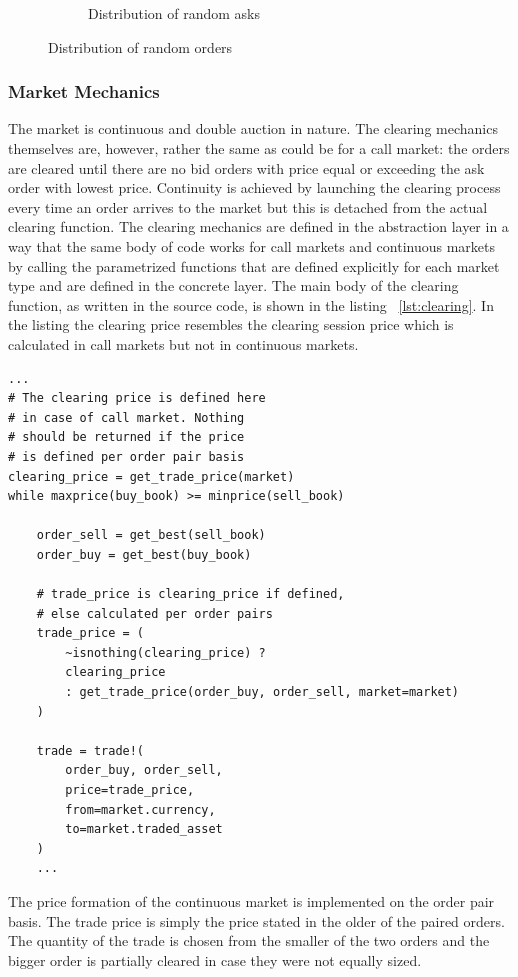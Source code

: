 \begin{figure}
\begin{subfigure}{.5\textwidth}
      \caption{Distribution of random asks}
      \label{fig:gener_asks}
    \end{subfigure}
    \caption{Distribution of random orders}
    \label{fig:generated_orders}
\end{figure}


\subsubsection{Market Mechanics}
The market is continuous and double auction in nature.
The clearing mechanics themselves are, however, 
rather the same as could be for a call market: 
the orders are cleared until there
are no bid orders with price equal or exceeding the
ask order with lowest price. 
Continuity is achieved by launching the clearing process
every time an order arrives to the market but this is
detached from the actual clearing function. 
The clearing mechanics are defined in 
the abstraction layer in a way that the same body
of code works for call markets and continuous markets
by calling the parametrized functions that are 
defined explicitly for each market type and are defined
in the concrete layer. The main body of the clearing function, 
as written in the source code, is shown in the listing ~\ref{lst:clearing}.
In the listing the clearing price resembles the clearing
session price which is calculated in call markets but not in
continuous markets.


\begin{lstlisting}[caption={Clearing process},label={lst:clearing}]
...
# The clearing price is defined here
# in case of call market. Nothing
# should be returned if the price
# is defined per order pair basis
clearing_price = get_trade_price(market)
while maxprice(buy_book) >= minprice(sell_book)

    order_sell = get_best(sell_book)
    order_buy = get_best(buy_book)
    
    # trade_price is clearing_price if defined,
    # else calculated per order pairs
    trade_price = (
        ~isnothing(clearing_price) ? 
        clearing_price
        : get_trade_price(order_buy, order_sell, market=market)
    )

    trade = trade!(
        order_buy, order_sell, 
        price=trade_price, 
        from=market.currency, 
        to=market.traded_asset
    )
    ...
\end{lstlisting}

The price formation of the continuous market is implemented
on the order pair basis. The trade price is simply the price
stated in the older of the paired orders. %
The quantity of the trade is chosen from the smaller of the two orders
and the bigger order is partially cleared in case they were not 
equally sized.

